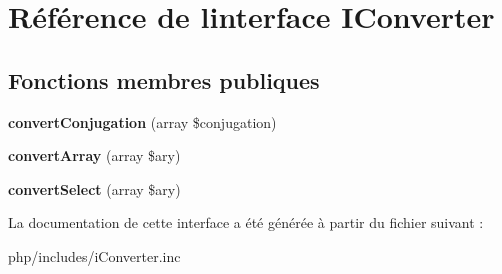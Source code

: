 \hypertarget{interfaceIConverter}{}\section{Référence de l\textquotesingle{}interface I\+Converter}
\label{interfaceIConverter}
\subsection*{Fonctions membres publiques}
\begin{DoxyCompactItemize}
\item 
\hypertarget{interfaceIConverter_a70da506cb0dc20f14fc4e115bb100be4}{}\label{interfaceIConverter_a70da506cb0dc20f14fc4e115bb100be4} 
{\bfseries convert\+Conjugation} (array \$conjugation)
\item 
\hypertarget{interfaceIConverter_a4afb4ac5fbf61f0d82dcc8393475d34a}{}\label{interfaceIConverter_a4afb4ac5fbf61f0d82dcc8393475d34a} 
{\bfseries convert\+Array} (array \$ary)
\item 
\hypertarget{interfaceIConverter_a5d0890843015f4f9bf962ed9ac67504c}{}\label{interfaceIConverter_a5d0890843015f4f9bf962ed9ac67504c} 
{\bfseries convert\+Select} (array \$ary)
\end{DoxyCompactItemize}


La documentation de cette interface a été générée à partir du fichier suivant \+:\begin{DoxyCompactItemize}
\item 
php/includes/i\+Converter.\+inc\end{DoxyCompactItemize}
